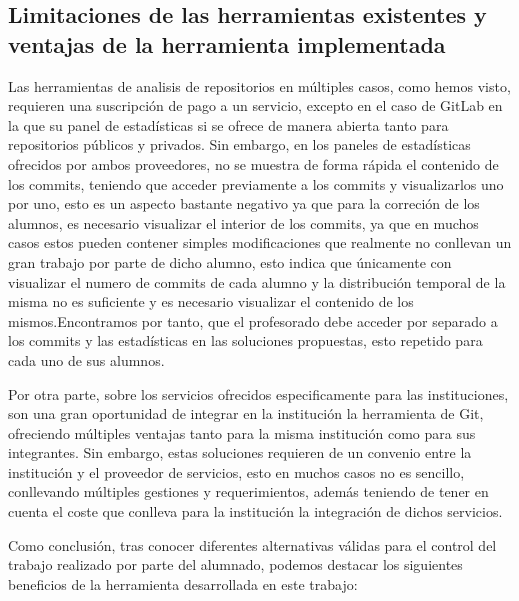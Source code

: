 




\subsection{Limitaciones de las herramientas existentes y ventajas de la herramienta implementada}

Las herramientas de analisis de repositorios en múltiples casos, como hemos visto, requieren una suscripción de pago a un servicio, excepto en el caso de GitLab en la que su panel de estadísticas si se ofrece de manera abierta tanto para repositorios públicos y privados. Sin embargo, en los paneles de estadísticas ofrecidos por ambos proveedores, no se muestra de forma rápida el contenido de los commits, teniendo que acceder previamente a los commits y visualizarlos uno por uno, esto es un aspecto bastante negativo ya que para la correción de los alumnos, es necesario visualizar el interior de los commits, ya que en muchos casos estos pueden contener simples modificaciones que realmente no conllevan un gran trabajo por parte de dicho alumno, esto indica que únicamente con visualizar el numero de commits de cada alumno y la distribución temporal de la misma no es suficiente y es necesario visualizar el contenido de los mismos.Encontramos por tanto, que el profesorado debe acceder por separado a los commits y las estadísticas en las soluciones propuestas, esto repetido para cada uno de sus alumnos.

Por otra parte, sobre los servicios ofrecidos especificamente para las instituciones, son una gran oportunidad de integrar en la institución la herramienta de Git, ofreciendo múltiples ventajas tanto para la misma institución como para sus integrantes. Sin embargo, estas soluciones requieren de un convenio entre la institución y el proveedor de servicios, esto en muchos casos no es sencillo, conllevando múltiples gestiones y requerimientos, además teniendo de tener en cuenta el coste que conlleva para la institución la integración de dichos servicios.

Como conclusión, tras conocer diferentes alternativas válidas para el control del trabajo realizado por parte del alumnado, podemos destacar los siguientes beneficios de la herramienta desarrollada en este trabajo:

